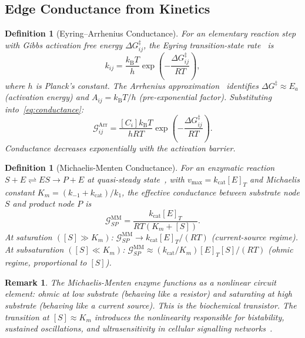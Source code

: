 \documentclass[twocolumn,10pt,a4paper]{article}
\newcommand{\kB}{k_{\mathrm{B}}}
\newcommand{\Gcond}{\mathcal{G}}
\newtheorem{definition}[theorem]{Definition}
\newtheorem{remark}[theorem]{Remark}
\begin{document}
\subsection{Edge Conductance from Kinetics}
\label{sec:circuit-conductance}

\begin{definition}[Eyring--Arrhenius Conductance]
\label{def:arrhenius-cond}
For an elementary reaction step with Gibbs activation free energy
$\Delta G^\ddagger_{ij}$, the Eyring transition-state
rate~\cite{Eyring1935,Evans1935} is
\begin{equation}
  k_{ij} = \frac{\kB T}{h}\exp\!\left(-\frac{\Delta G^\ddagger_{ij}}{RT}\right),
  \label{eq:eyring}
\end{equation}
where $h$ is Planck's constant.  The Arrhenius approximation~\cite{Arrhenius1889}
identifies $\Delta G^\ddagger\approx E_a$ (activation energy) and
$A_{ij}=\kB T/h$ (pre-exponential factor).  Substituting
into~\eqref{eq:conductance}:
\begin{equation}
  \Gcond_{ij}^{\mathrm{Arr}} = \frac{[C_i]\kB T}{hRT}
    \exp\!\left(-\frac{\Delta G^\ddagger_{ij}}{RT}\right).
  \label{eq:cond-arr}
\end{equation}
Conductance decreases exponentially with the activation barrier.
\end{definition}

\begin{definition}[Michaelis-Menten Conductance]
\label{def:mm-cond}
For an enzymatic reaction $S+E\rightleftharpoons ES\to P+E$ at quasi-steady
state~\cite{MichaelisMenten1913,Briggs1925}, with $v_{\max}=k_{\mathrm{cat}}[E]_T$
and Michaelis constant $K_m=(k_{-1}+k_{\mathrm{cat}})/k_1$, the effective
conductance between substrate node $S$ and product node $P$ is
\begin{equation}
  \Gcond_{SP}^{\mathrm{MM}} = \frac{k_{\mathrm{cat}}[E]_T}{RT(K_m+[S])}.
  \label{eq:cond-mm}
\end{equation}
At saturation $([S]\gg K_m)$:
$\Gcond_{SP}^{\mathrm{MM}}\to k_{\mathrm{cat}}[E]_T/(RT)$ (current-source regime).
At subsaturation $([S]\ll K_m)$:
$\Gcond_{SP}^{\mathrm{MM}}\approx(k_{\mathrm{cat}}/K_m)[E]_T[S]/(RT)$
(ohmic regime, proportional to $[S]$).
\end{definition}

\begin{remark}
The Michaelis-Menten enzyme functions as a nonlinear circuit element: ohmic at
low substrate (behaving like a resistor) and saturating at high substrate
(behaving like a current source).  This is the biochemical transistor.  The
transition at $[S]\approx K_m$ introduces the nonlinearity responsible for
bistability, sustained oscillations, and ultrasensitivity in cellular signalling
networks~\cite{Tyson2003,HeinrichSchuster1996,Strogatz1994}.
\end{remark}
\end{document}
